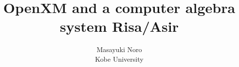 \newtheorem{df}{Definition}
\newtheorem{pr}[df]{Proposition}
\newtheorem{lm}[df]{Lemma}
\newtheorem{th}[df]{Theorem}
\newtheorem{co}[df]{Corollary}
\newtheorem{al}[df]{Algorithm}
\newtheorem{re}[df]{Remark}
\newtheorem{ex}[df]{Example}
\newtheorem{mt}[df]{Method}
\newtheorem{nt}[df]{Notation}
\newtheorem{as}[df]{Assumption}
\newtheorem{pro}[df]{Procedure}
\newtheorem{prob}[df]{Probrem}
\newcommand{\qed}{$\Box$}
\newcommand{\mred}[1]{\smash{\mathop{\hbox{\rightarrowfill}}\limits_{\scriptstyle #1}}}
\newcommand{\tmred}[1]{\smash{\mathop{\hbox{\rightarrowfill}}\limits_{\scriptstyle #1}\limits^{\scriptstyle *}}}
\def\gr{Gr\"obner basis }
\def\st{\, s.t. \,}
\def\ni{\noindent} 
\def\ve{\vfill\eject} 
\textwidth 9.2in
\textheight 7.2in
\columnsep 0.33in
\topmargin -1in

\title{OpenXM and a computer algebra system Risa/Asir}

\author{Masayuki Noro\\ Kobe University}

\setlength{\parskip}{10pt}
\maketitle
{}


